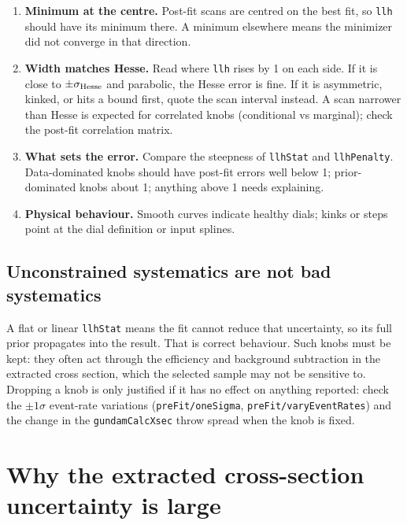 \documentclass[11pt]{article}
\newcommand{\code}[1]{\texttt{#1}}
\begin{document}
\begin{enumerate}
  \item \textbf{Minimum at the centre.} Post-fit scans are centred on the best fit,
    so \code{llh} should have its minimum there. A minimum elsewhere means the
    minimizer did not converge in that direction.
  \item \textbf{Width matches Hesse.} Read where \code{llh} rises by 1 on each side.
    If it is close to $\pm\sigma_{\rm Hesse}$ and parabolic, the Hesse error is
    fine. If it is asymmetric, kinked, or hits a bound first, quote the scan
    interval instead. A scan narrower than Hesse is expected for correlated knobs
    (conditional vs marginal); check the post-fit correlation matrix.
  \item \textbf{What sets the error.} Compare the steepness of \code{llhStat} and
    \code{llhPenalty}. Data-dominated knobs should have post-fit errors well below
    1; prior-dominated knobs about 1; anything above 1 needs explaining.
  \item \textbf{Physical behaviour.} Smooth curves indicate healthy dials; kinks or
    steps point at the dial definition or input splines.
\end{enumerate}

\subsection{Unconstrained systematics are not bad systematics}

A flat or linear \code{llhStat} means the fit cannot reduce that uncertainty, so
its full prior propagates into the result. That is correct behaviour. Such knobs
must be kept: they often act through the efficiency and background subtraction
in the extracted cross section, which the selected sample may not be sensitive
to. Dropping a knob is only justified if it has no effect on anything reported:
check the $\pm1\sigma$ event-rate variations (\code{preFit/oneSigma},
\code{preFit/varyEventRates}) and the change in the \code{gundamCalcXsec} throw
spread when the knob is fixed.

\section{Why the extracted cross-section uncertainty is large}
\label{sec:xsecunc}
\end{document}
